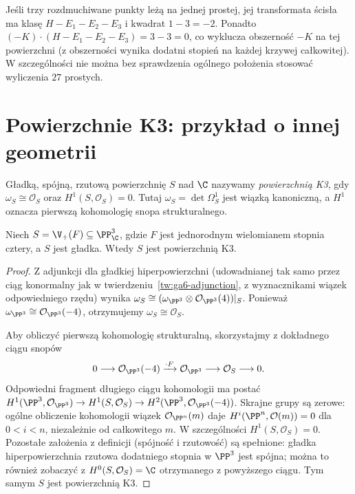\begin{uwaga}
Jeśli trzy rozdmuchiwane punkty leżą na jednej prostej,
jej transformata ścisła ma klasę $H-E_1-E_2-E_3$
i kwadrat $1-3=-2$. Ponadto
$(-K)\cdot(H-E_1-E_2-E_3)=3-3=0$,
co wyklucza obszerność $-K$ na tej powierzchni
(z obszerności wynika dodatni stopień na każdej
krzywej całkowitej). W szczególności nie można
bez sprawdzenia ogólnego położenia stosować
wyliczenia $27$ prostych.
\end{uwaga}

\section{Powierzchnie K3: przykład o innej geometrii}
\label{sec:ga6-k3}

\begin{definicja}[Powierzchnia K3]
Gładką, spójną, rzutową powierzchnię $S$ nad $\C$
nazywamy \emph{powierzchnią K3}, gdy
$\omega_S\cong\mathcal O_S$ oraz
$H^1(S,\mathcal O_S)=0$. Tutaj
$\omega_S=\det\Omega_S^1$ jest wiązką kanoniczną,
a $H^1$ oznacza pierwszą kohomologię snopa strukturalnego.
\end{definicja}

\begin{twierdzenie}
\label{tw:ga6-quartic-k3}
Niech $S=\V_+(F)\subseteq\PP^3_\C$, gdzie $F$
jest jednorodnym wielomianem stopnia cztery, a $S$
jest gładka. Wtedy $S$ jest powierzchnią K3.
\end{twierdzenie}
\begin{proof}
Z adjunkcji dla gładkiej hiperpowierzchni
(udowadnianej tak samo przez ciąg konormalny jak
w twierdzeniu~\ref{tw:ga6-adjunction}, z wyznacznikami
wiązek odpowiedniego rzędu) wynika
$\omega_S\cong(\omega_{\PP^3}\otimes
\mathcal O_{\PP^3}(4))|_S$.
Ponieważ $\omega_{\PP^3}\cong\mathcal O_{\PP^3}(-4)$,
otrzymujemy $\omega_S\cong\mathcal O_S$.

Aby obliczyć pierwszą kohomologię strukturalną,
skorzystajmy z dokładnego ciągu snopów
\[
0\longrightarrow\mathcal O_{\PP^3}(-4)
\xrightarrow{\cdot F}\mathcal O_{\PP^3}
\longrightarrow\mathcal O_S\longrightarrow0.
\]
Odpowiedni fragment długiego ciągu kohomologii ma postać
$H^1(\PP^3,\mathcal O_{\PP^3})\to
H^1(S,\mathcal O_S)\to
H^2(\PP^3,\mathcal O_{\PP^3}(-4))$.
Skrajne grupy są zerowe: ogólne obliczenie kohomologii
wiązek $\mathcal O_{\PP^n}(m)$ daje
$H^i(\PP^n,\mathcal O(m))=0$ dla $0<i<n$,
niezależnie od całkowitego $m$. W szczególności
$H^1(S,\mathcal O_S)=0$.
Pozostałe założenia z definicji (spójność i
rzutowość) są spełnione: gładka hiperpowierzchnia
rzutowa dodatniego stopnia w $\PP^3$ jest spójna;
można to również zobaczyć z
$H^0(S,\mathcal O_S)=\C$ otrzymanego z powyższego
ciągu. Tym samym $S$ jest powierzchnią K3.
\end{proof}


